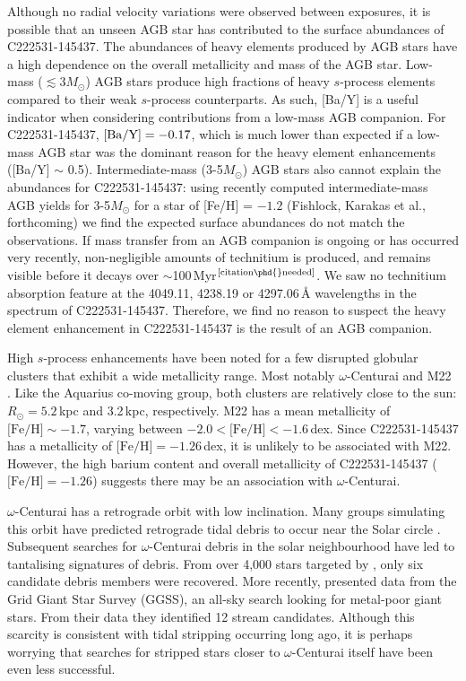 \documentclass{emulateapj}
\begin{document}
Although no radial velocity variations were observed between exposures, it is possible that an unseen AGB star has contributed to the surface abundances of C222531-145437. The abundances of heavy elements produced by AGB stars have a high dependence on the overall metallicity and mass of the AGB star. Low-mass ($\lesssim{}3M_\odot$) AGB stars produce high fractions of heavy $s$-process elements compared to their weak $s$-process counterparts. As such, [Ba/Y] is a useful indicator when considering contributions from a low-mass AGB companion. For C222531-145437, ${{\rm [Ba/Y]} = -0.17}$, which is much lower than expected if a low-mass AGB star was the dominant reason for the heavy element enhancements ([Ba/Y] $\sim$ 0.5). Intermediate-mass (3-5$M_\odot$) AGB stars also cannot explain the abundances for C222531-145437: using recently computed intermediate-mass AGB yields for 3-5$M_\odot$ for a star of [Fe/H] = $-1.2$ (Fishlock, Karakas et al., forthcoming) we find the expected surface abundances do not match the observations. If mass transfer from an AGB companion is ongoing or has occurred very recently, non-negligible amounts of technitium is produced, and remains visible before it decays over $\sim$100\,Myr$^{\rm [citation\phd{}needed]}$. We saw no technitium absorption feature at the 4049.11, 4238.19 or 4297.06\,{\AA} wavelengths in the spectrum of C222531-145437. Therefore, we find no reason to suspect the heavy element enhancement in C222531-145437 is the result of an AGB companion.

High $s$-process enhancements have been noted for a few disrupted globular clusters that exhibit a wide metallicity range. Most notably $\omega$-Centurai \citep{majewski;et-al_2012} and M22 \citep{marino;et-al_2011}. Like the Aquarius co-moving group, both clusters are relatively close to the sun: {$R_\odot = 5.2$\,kpc} and {3.2\,kpc}, respectively. M22 has a mean metallicity of {$\mbox{[Fe/H]} \sim -1.7$}, varying between {$-2.0 < \mbox{[Fe/H]} < -1.6$\,dex}. Since {C222531-145437} has a metallicity of {$\mbox{[Fe/H]} = -1.26$\,dex}, it is unlikely to be associated with M22. However, the high barium content and overall metallicity of {C222531-145437} ({$\mbox{[Fe/H]} = -1.26$}) suggests there may be an association with $\omega$-Centurai.

$\omega$-Centurai has a retrograde orbit with low inclination. Many groups simulating this orbit have predicted retrograde tidal debris to occur near the Solar circle \citep{dinescu_2002,tsuchiya_2003,tsuchiya_2004,bekki;freeman_2003}. Subsequent searches for $\omega$-Centurai debris in the solar neighbourhood have led to tantalising signatures of debris. From over 4,000 stars targeted by \citet{da_costa;coleman_2008}, only six candidate debris members were recovered. More recently, \citet{majewski;et-al_2012} presented data from the Grid Giant Star Survey (GGSS), an all-sky search looking for metal-poor giant stars. From their data they identified 12 stream candidates. Although this scarcity is consistent with tidal stripping occurring long ago, it is perhaps worrying that searches for stripped stars closer to $\omega$-Centurai itself have been even less successful.
\end{document}
